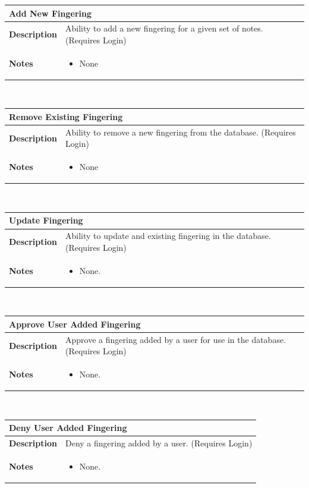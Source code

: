 \documentclass[12pt,english]{article}
\providecommand{\tabularnewline}{\\}
\providecommand{\tabularnewline}{\\}
\begin{document}
\begin{tabular}{|p{3cm}|p{13cm}|}
\hline 
\multicolumn{2}{|l|}{\textbf{Add New Fingering}}\tabularnewline
\hline 
\textbf{Description}  & Ability to add a new fingering for a given set of notes. (Requires
Login) \tabularnewline
\hline 
\textbf{Notes}  & \begin{itemize}
\item None \end{itemize}
\tabularnewline
\hline 
\end{tabular}\\[0.5cm] %
\begin{tabular}{|p{3cm}|p{13cm}|}
\hline 
\multicolumn{2}{|l|}{\textbf{Remove Existing Fingering}}\tabularnewline
\hline 
\textbf{Description}  & Ability to remove a new fingering from the database. (Requires Login) \tabularnewline
\hline 
\textbf{Notes}  & \begin{itemize}
\item None \end{itemize}
\tabularnewline
\hline 
\end{tabular}\\[0.5cm] %
\begin{tabular}{|p{3cm}|p{13cm}|}
\hline 
\multicolumn{2}{|l|}{\textbf{Update Fingering}}\tabularnewline
\hline 
\textbf{Description}  & Ability to update and existing fingering in the database. (Requires
Login) \tabularnewline
\hline 
\textbf{Notes}  & \begin{itemize}
\item None. \end{itemize}
\tabularnewline
\hline 
\end{tabular}\\[0.5cm] %
\begin{tabular}{|p{3cm}|p{13cm}|}
\hline 
\multicolumn{2}{|l|}{\textbf{Approve User Added Fingering}}\tabularnewline
\hline 
\textbf{Description}  & Approve a fingering added by a user for use in the database. (Requires
Login) \tabularnewline
\hline 
\textbf{Notes}  & \begin{itemize}
\item None. \end{itemize}
\tabularnewline
\hline 
\end{tabular}\\[0.5cm] %
\begin{tabular}{|p{3cm}|p{13cm}|}
\hline 
\multicolumn{2}{|l|}{\textbf{Deny User Added Fingering}}\tabularnewline
\hline 
\textbf{Description}  & Deny a fingering added by a user. (Requires Login) \tabularnewline
\hline 
\textbf{Notes}  & \begin{itemize}
\item None. \end{itemize}
\tabularnewline
\hline 
\end{tabular}\\[0.5cm] %
\end{document}
